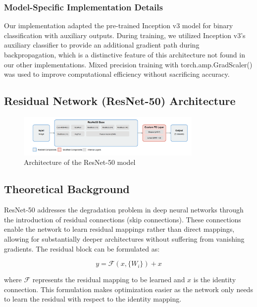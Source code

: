 \documentclass[a4paper,12pt]{report}
\begin{document}
\subsubsection{Model-Specific Implementation Details}

Our implementation adapted the pre-trained Inception v3 model for binary classification with auxiliary outputs. During training, we utilized Inception v3's auxiliary classifier to provide an additional gradient path during backpropagation, which is a distinctive feature of this architecture not found in our other implementations. Mixed precision training with torch.amp.GradScaler() was used to improve computational efficiency without sacrificing accuracy.

\subsection{Residual Network (ResNet-50) Architecture}

\begin{figure}[H]
    \centering
    \includegraphics[width=0.8\textwidth]{images/architecture/resnet.png}
    \caption{Architecture of the ResNet-50 model}
    \label{fig:resnet_architecture}
\end{figure}

\subsection*{Theoretical Background}

ResNet-50 \citep{he2016deep} addresses the degradation problem in deep neural networks through the introduction of residual connections (skip connections). These connections enable the network to learn residual mappings rather than direct mappings, allowing for substantially deeper architectures without suffering from vanishing gradients. The residual block can be formulated as:

\begin{equation}
y = \mathcal{F}(x, \{W_i\}) + x
\end{equation}

where $\mathcal{F}$ represents the residual mapping to be learned and $x$ is the identity connection. This formulation makes optimization easier as the network only needs to learn the residual with respect to the identity mapping.
\end{document}
